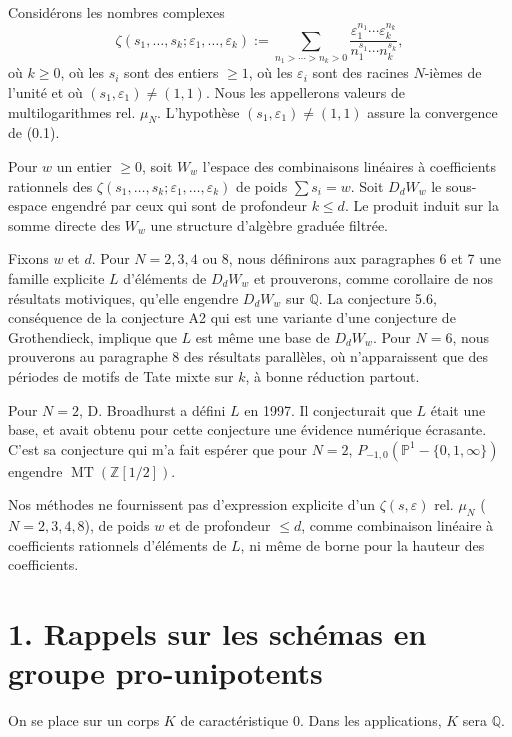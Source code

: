 \documentclass[10pt,a4paper]{article}
\newcommand{\Q}{\mathbb Q}
\newcommand{\Z}{\mathbb Z}
\newcommand{\Pone}{\mathbb P^1}
\newcommand{\MT}{\operatorname{MT}}
\theoremstyle{deligne}
\begin{document}
Considérons les nombres complexes
\[
\tag{0.1}
\zeta(s_1,\ldots,s_k;\varepsilon_1,\ldots,\varepsilon_k)
:=
\sum_{n_1>\cdots>n_k>0}
\frac{\varepsilon_1^{n_1}\cdots \varepsilon_k^{n_k}}
     {n_1^{s_1}\cdots n_k^{s_k}},
\]
où \(k\ge0\), où les \(s_i\) sont des entiers \(\ge1\), où les \(\varepsilon_i\) sont des racines \(N\)-ièmes de l'unité et où \((s_1,\varepsilon_1)\ne(1,1)\). Nous les appellerons valeurs de multilogarithmes rel. \(\mu_N\). L'hypothèse \((s_1,\varepsilon_1)\ne(1,1)\) assure la convergence de (0.1).

Pour \(w\) un entier \(\ge0\), soit \(W_w\) l'espace des combinaisons linéaires à coefficients rationnels des \(\zeta(s_1,\ldots,s_k;\varepsilon_1,\ldots,\varepsilon_k)\) de poids \(\sum s_i=w\). Soit \(D_dW_w\) le sous-espace engendré par ceux qui sont de profondeur \(k\le d\). Le produit induit sur la somme directe des \(W_w\) une structure d'algèbre graduée filtrée.

Fixons \(w\) et \(d\). Pour \(N=2,3,4\) ou \(8\), nous définirons aux paragraphes 6 et 7 une famille explicite \(L\) d'éléments de \(D_dW_w\) et prouverons, comme corollaire de nos résultats motiviques, qu'elle engendre \(D_dW_w\) sur \(\Q\). La conjecture 5.6, conséquence de la conjecture A2 qui est une variante d'une conjecture de Grothendieck, implique que \(L\) est même une base de \(D_dW_w\). Pour \(N=6\), nous prouverons au paragraphe 8 des résultats parallèles, où n'apparaissent que des périodes de motifs de Tate mixte sur \(k\), à bonne réduction partout.

Pour \(N=2\), D. Broadhurst a défini \(L\) en 1997. Il conjecturait que \(L\) était une base, et avait obtenu pour cette conjecture une évidence numérique écrasante. C'est sa conjecture qui m'a fait espérer que pour \(N=2\), \(P_{-1,0}(\Pone-\{0,1,\infty\})\) engendre \(\MT(\Z[1/2])\).

Nos méthodes ne fournissent pas d'expression explicite d'un \(\zeta(s,\varepsilon)\) rel. \(\mu_N\) (\(N=2,3,4,8\)), de poids \(w\) et de profondeur \(\le d\), comme combinaison linéaire à coefficients rationnels d'éléments de \(L\), ni même de borne pour la hauteur des coefficients.

\section*{1. Rappels sur les schémas en groupe pro-unipotents}

On se place sur un corps \(K\) de caractéristique \(0\). Dans les applications, \(K\) sera \(\Q\).
\end{document}
